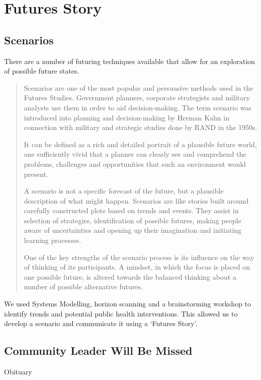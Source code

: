 \chapter{Futures Story}

\section{Scenarios}
There are a number of futuring techniques available that allow for an exploration of possible future states.

\begin{quotation}
Scenarios are one of the most popular and persuasive methods used in the Futures Studies. Government planners, corporate strategists and military analysts use them in order to aid decision-making. The term scenario was introduced into planning and decision-making by Herman Kahn in connection with military and strategic studies done by RAND in the 1950s.

It can be defined as a rich and detailed portrait of a plausible future world, one sufficiently vivid that a planner can clearly see and comprehend the problems, challenges and opportunities that such an environment would present.

A scenario is not a specific forecast of the future, but a plausible description of what might happen. Scenarios are like stories built around carefully constructed plots based on trends and events. They assist in selection of strategies, identification of possible futures, making people aware of uncertainties and opening up their imagination and initiating learning processes.

One of the key strengths of the scenario process is its influence on the way of thinking of its participants. A mindset, in which the focus is placed on one possible future, is altered towards the balanced thinking about a number of possible alternative futures.\cite{WikipediaSP}
\end{quotation}

We used Systems Modelling, horizon scanning and a brainstorming workshop to identify trends and potential public health interventions. This allowed us to develop a scenario and communicate it using a `Futures Story'.

\section{Community Leader Will Be Missed} 
Obituary

